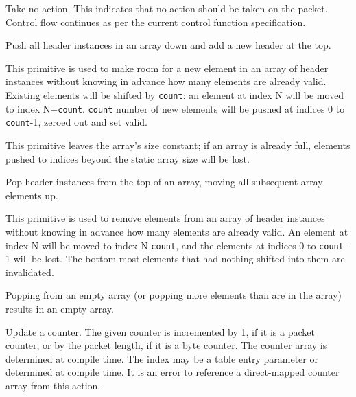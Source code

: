 \documentclass[12pt]{article}
\begin{document}
{ %
Take no action.
}
{ %
}
{ %
This indicates that no action should be taken on the packet. Control flow 
continues as per the current control function specification. 
}


{ %
Push all header instances in an array down and add a new header at the top.
}
{ %
}
{ %
This primitive is used to make room for a new element in an array of header
instances without knowing in advance how many elements are already valid. 
{\color{red}Existing elements will be shifted by \texttt{count}: an
element at index N will be moved to index N+\texttt{count}. 
\texttt{count} number of new elements will be pushed at indices 0 to 
\texttt{count}-1, zeroed out and set valid.}

This primitive leaves the array's size constant; if an array is already full,
elements pushed to indices beyond the static array size will be lost.
}


{ %
Pop header instances from the top of an array, moving all subsequent array elements up.
}
{ %
}
{ %
This primitive is used to remove elements from an array of header instances
without knowing in advance how many elements are already valid. {\color{red}An element at
index N will be moved to index N-\texttt{count}, and the elements at indices 0 to 
\texttt{count}-1 will be lost. The
bottom-most elements that had nothing shifted into them are invalidated.}

Popping from an empty array (or popping more elements than are in the array)
results in an empty array.
}


{ %
Update a counter.
}
{ %
}
{ %
The given counter is incremented by 1, if it is a packet counter, or by the 
packet length, if it is a byte counter.  The counter array is determined 
at compile time.  The index may be a table entry parameter or determined at 
compile time. It is an error to reference a direct-mapped counter array from 
this action.
}
\end{document}

